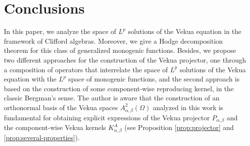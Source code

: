 \documentclass[12pt]{article}
\newcommand{\comment}[1]{\marginpar{\hfuzz=5ex
\scriptsize$\stackrel{?}{\longleftarrow}$\\\hspace*{-3ex}
{\fbox{\parbox{20ex}{\hfuzz=15ex \raggedright\sf#1 }}} }}
\begin{document}

\section{Conclusions}
 In this paper, we analyze the space of $L^p$ solutions of the Vekua equation in the framework of Clifford algebras. Moreover, we give a Hodge decomposition theorem for this class of generalized monogenic functions. Besides, we propose two different approaches for the construction of the Vekua projector, one through a composition of operators that interrelate the space of $L^p$ solutions of the Vekua equation with the $L^p$ space of monogenic functions, and the second approach is based on the construction of some component-wise reproducing kernel, in the classic Bergman's sense.
The author is aware that the construction of an orthonormal basis of the Vekua spaces $A^2_{\alpha,\beta}(\Omega)$ analyzed in this work is fundamental for obtaining explicit expressions of the Vekua projector $P_{\alpha,\beta}$ and the component-wise Vekua kernels $K_{\alpha,\beta}^A$ (see Proposition \ref{prop:projector} and \ref{prop:several-properties}).  
\end{document}
